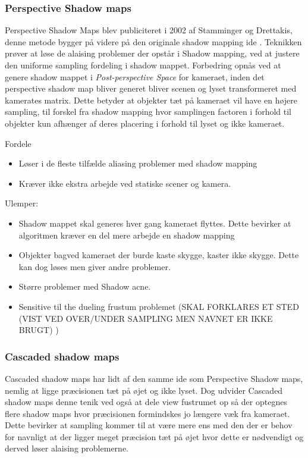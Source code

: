 \documentclass[11pt,a4paper]{article}
\begin{document}
\subsubsection{Perspective Shadow maps}

Perspective Shadow Maps \cite{PSMAP} blev publiciteret i 2002 af Stamminger og Drettakis, denne metode bygger på videre på den originale shadow mapping ide \cite{SMAP}. Teknikken prøver at løse de alaising problemer der opstår i Shadow mapping, ved at justere den uniforme sampling fordeling i shadow mappet. Forbedring opnås ved at genere shadow mappet i \textit{Post-perspective Space} for kameraet, inden det perspective shadow map bliver generet bliver scenen og lyset transformeret med kamerates matrix. Dette betyder at objekter tæt på kameraet vil have en højere sampling, til forskel fra shadow mapping hvor samplingen factoren i forhold til objekter kun afhænger af deres placering i forhold til lyset og ikke kameraet.


Fordele
\begin{itemize}
  \item Løser i de fleste tilfælde aliasing problemer med shadow mapping
  \item Kræver ikke ekstra arbejde ved statiske scener og kamera.
\end{itemize}

Ulemper:
\begin{itemize}
  \item Shadow mappet skal generes  hver gang kameraet flyttes. Dette bevirker at algoritmen kræver en del mere arbejde en shadow mapping
  \item Objekter bagved kameraet der burde kaste skygge, kaster ikke skygge. Dette kan dog løses men giver andre problemer.
  \item Større problemer med Shadow acne.
  \item	Sensitive til the dueling frustum problemet (SKAL FORKLARES ET STED (VIST VED OVER/UNDER SAMPLING MEN NAVNET ER IKKE BRUGT) )
\end{itemize}

\subsubsection{Cascaded shadow maps}

Cascaded shadow maps har lidt af den samme ide som Perspective Shadow maps, nemlig at ligge præcisionen tæt på øjet og ikke lyset. Dog udvider Cascaded shadow maps denne tenik ved også at dele view fustrumet op så der optegnes flere shadow maps hvor præcisionen formindskes jo længere væk fra kameraet.  Dette bevirker at sampling kommer til at være mere ens med den der er behov for navnligt at der ligger meget præcision tæt på øjet hvor dette er nødvendigt og derved løser alaising problemerne.
\end{document}
